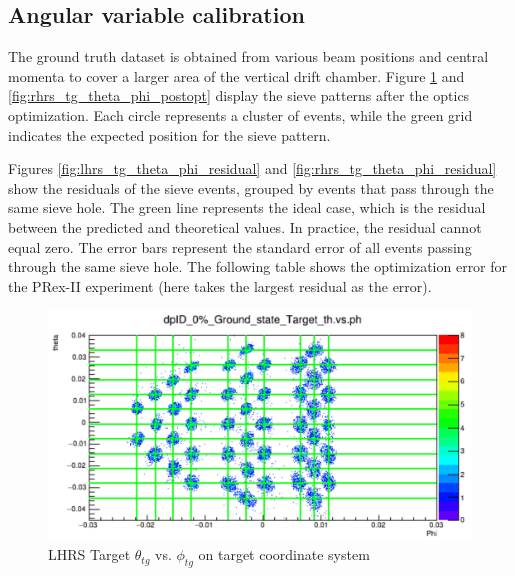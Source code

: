 \subsection{Angular variable calibration}

The ground truth dataset is obtained from various beam positions and central momenta to cover a larger area of the vertical drift chamber. Figure \ref{fig:lhrs_tg_theta_phi_postopt} and \ref{fig:rhrs_tg_theta_phi_postopt} display the sieve patterns after the optics optimization. Each circle represents a cluster of events, while the green grid indicates the expected position for the sieve pattern.

Figures \ref{fig:lhrs_tg_theta_phi_residual} and \ref{fig:rhrs_tg_theta_phi_residual} show the residuals of the sieve events, grouped by events that pass through the same sieve hole. The green line represents the ideal case, which is the residual between the predicted and theoretical values. In practice, the residual cannot equal zero. The error bars represent the standard error of all events passing through the same sieve hole. The following table shows the optimization error for the PRex-II experiment (here takes the largest residual as the error).

\begin{figure}[h]
    \centering
    \includegraphics[width =\textwidth]{images/chap4/LHRS_tg_theta_phi_after_opt.png}
    \caption{LHRS Target $\theta_{tg}$ vs. $\phi_{tg}$ on target coordinate system}
    \label{fig:lhrs_tg_theta_phi_postopt}
\end{figure}

